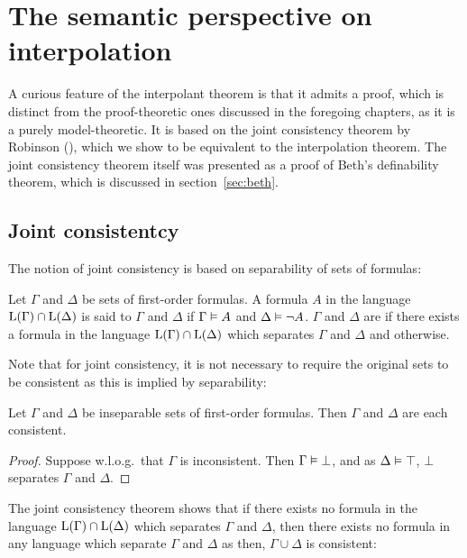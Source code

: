 
\chapter{The semantic perspective on interpolation}

A curious feature of the interpolant theorem is that it admits a proof, which is distinct from the proof-theoretic ones discussed in the foregoing chapters, as it is a purely model-theoretic.
It is based on the joint consistency theorem by Robinson (\cite{robinson1956result}), which we show to be equivalent to the interpolation theorem.
The joint consistency theorem itself was presented as a proof of Beth's definability theorem, which is discussed in section~\ref{sec:beth}.

\section{Joint consistentcy}
\label{sec:joint_consistency}

The notion of joint consistency is based on separability of sets of formulas:

\begin{defi}[Separability]
	Let $\Gamma$ and $\Delta$ be sets of first-order formulas.
	A formula $A$ in the language $\operatorname{L}(\Gamma)\cap \operatorname{L}(\Delta)$ is said to  $\Gamma$ and $\Delta$ if $\Gamma \vDash A$ and $\Delta \vDash \lnot A$.
	$\Gamma$ and $\Delta$ are  if there exists a formula in the language $\operatorname{L}(\Gamma)\cap \operatorname{L}(\Delta)$ which separates $\Gamma$ and $\Delta$ and  otherwise.
\end{defi}

Note that for joint consistency, it is not necessary to require the original sets to be consistent as this is implied by separability:

\begin{lemma}
	\label{lemma:insep_consistent}
	Let $\Gamma$ and $\Delta$ be inseparable sets of first-order formulas. Then $\Gamma$ and $\Delta$ are each consistent.
\end{lemma}
\begin{proof}
	Suppose w.l.o.g.\ that $\Gamma$ is inconsistent. Then $\Gamma \vDash \bot$, and as $\Delta \vDash \top$, $\bot$ separates $\Gamma$ and $\Delta$.
\end{proof}

The joint consistency theorem shows that if there exists no formula in the language $\operatorname{L}(\Gamma)\cap \operatorname{L}(\Delta)$ which separates $\Gamma$ and $\Delta$, then there exists no formula in any language which separate $\Gamma$ and $\Delta$ as then, $\Gamma \cup \Delta$ is consistent:

